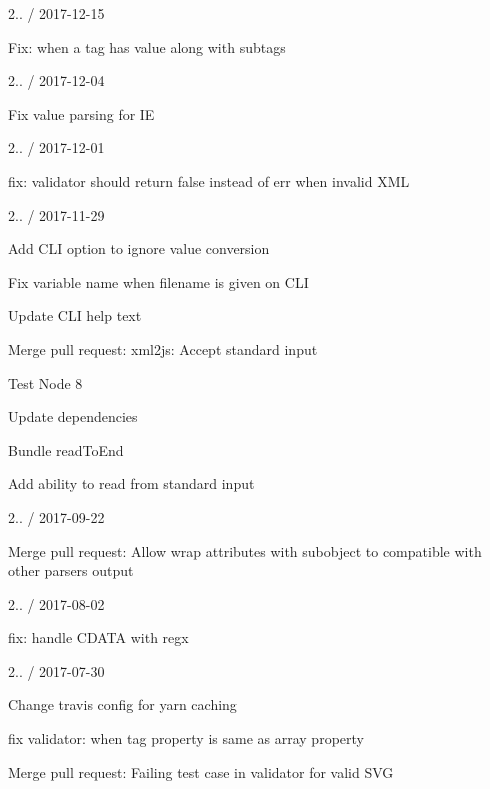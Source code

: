 2.. / 2017-\/12-\/15
\begin{DoxyItemize}
\item Fix\+: when a tag has value along with subtags
\end{DoxyItemize}

2.. / 2017-\/12-\/04
\begin{DoxyItemize}
\item Fix value parsing for IE
\end{DoxyItemize}

2.. / 2017-\/12-\/01
\begin{DoxyItemize}
\item fix\+: validator should return false instead of err when invalid XML
\end{DoxyItemize}

2.. / 2017-\/11-\/29
\begin{DoxyItemize}
\item Add CLI option to ignore value conversion
\item Fix variable name when filename is given on CLI
\item Update CLI help text
\item Merge pull request\+: xml2js\+: Accept standard input
\item Test Node 8
\item Update dependencies
\item Bundle read\+To\+End
\item Add ability to read from standard input
\end{DoxyItemize}

2.. / 2017-\/09-\/22
\begin{DoxyItemize}
\item Merge pull request\+: Allow wrap attributes with subobject to compatible with other parsers output
\end{DoxyItemize}

2.. / 2017-\/08-\/02
\begin{DoxyItemize}
\item fix\+: handle CDATA with regx
\end{DoxyItemize}

2.. / 2017-\/07-\/30
\begin{DoxyItemize}
\item Change travis config for yarn caching
\item fix validator\+: when tag property is same as array property
\item Merge pull request\+: Failing test case in validator for valid SVG
\end{DoxyItemize}

